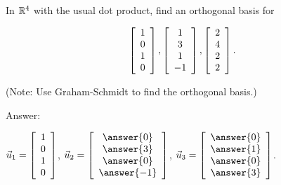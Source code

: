 \documentclass{ximera}
\begin{document}
\begin{problem}
  In $\R^4$ with the usual dot product, find an orthogonal basis for

  $$\startmat{c} 1 \\ 0 \\ 1 \\ 0 \stopmat,\startmat{c} 1 \\ 3 \\ 1 \\ -1 \stopmat
    ,\startmat{c} 2 \\ 4 \\ 2 \\ 2 \stopmat
    .$$

  (Note: Use Graham-Schmidt to find the orthogonal basis.)

  Answer:

    $\vect{u}_1 = \startmat{c} 1 \\ 0 \\ 1 \\ 0 \stopmat$,
    $\vect{u}_2 = \startmat{c} \answer{0} \\ \answer{3} \\ \answer{0} \\ \answer{-1} \stopmat$,
    $\vect{u}_3 = \startmat{c} \answer{0} \\ \answer{1} \\ \answer{0} \\ \answer{3} \stopmat$.

\end{problem}

\end{document}
